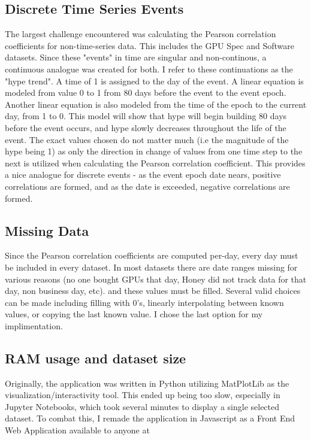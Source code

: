 \documentclass[twocolumn]{article}
\begin{document}
\subsection{Discrete Time Series Events}
The largest challenge encountered was calculating the Pearson correlation coefficients for non-time-series data. This includes the GPU Spec and Software datasets. Since these "events" in time are singular and non-continous, a continuous analogue was created for both. I refer to these continuations as the "hype trend". A time of 1 is assigned to the day of the event. A linear equation is modeled from value 0 to 1 from 80 days before the event to the event epoch. Another linear equation is also modeled from the time of the epoch to the current day, from 1 to 0. This model will show that hype will begin building 80 days before the event occurs, and hype slowly decreases throughout the life of the event. The exact values chosen do not matter much (i.e the magnitude of the hype being 1) as only the direction in change of values from one time step to the next is utilized when calculating the Pearson correlation coefficient. This provides a nice analogue for discrete events - as the event epoch date nears, positive correlations are formed, and as the date is exceeded, negative correlations are formed.

\subsection{Missing Data}
Since the Pearson correlation coefficients are computed per-day, every day must be included in every dataset. In most datasets there are date ranges missing for various reasons (no one bought GPUs that day, Honey did not track data for that day, non business day, etc). and these values must be filled. Several valid choices can be made including filling with 0's, linearly interpolating between known values, or copying the last known value. I chose the last option for my implimentation.

\subsection{RAM usage and dataset size}
Originally, the application was written in Python utilizing MatPlotLib as the visualization/interactivity tool. This ended up being too slow, especially in Jupyter Notebooks, which took several minutes to display a single selected dataset. To combat this, I remade the application in Javascript as a Front End Web Application available to anyone at \cite{jhammer3}
\end{document}
